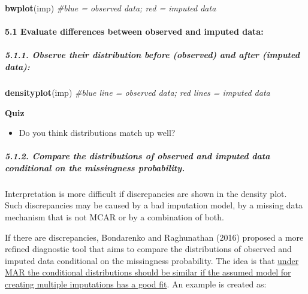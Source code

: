 \documentclass[
]{article}
\newenvironment{Shaded}{\begin{snugshade}}{\end{snugshade}}
\newcommand{\CommentTok}[1]{\textcolor[rgb]{0.56,0.35,0.01}{\textit{#1}}}
\newcommand{\FunctionTok}[1]{\textcolor[rgb]{0.13,0.29,0.53}{\textbf{#1}}}
\newcommand{\NormalTok}[1]{#1}
\providecommand{\tightlist}{%
  \setlength{\itemsep}{0pt}\setlength{\parskip}{0pt}}
\begin{document}
\begin{Shaded}
\begin{Highlighting}[]
\FunctionTok{bwplot}\NormalTok{(imp)    }\CommentTok{\#blue = observed data; red = imputed data}
\end{Highlighting}
\end{Shaded}

\hypertarget{evaluate-differences-between-observed-and-imputed-data}{%
\paragraph{5.1 Evaluate differences between observed and imputed
data:}\label{evaluate-differences-between-observed-and-imputed-data}}

\hypertarget{observe-their-distribution-before-observed-and-after-imputed-data}{%
\subparagraph{5.1.1. Observe their distribution before (observed) and
after (imputed
data):}\label{observe-their-distribution-before-observed-and-after-imputed-data}}

\begin{Shaded}
\begin{Highlighting}[]
\FunctionTok{densityplot}\NormalTok{(imp) }\CommentTok{\#blue line = observed data; red lines = imputed data }
\end{Highlighting}
\end{Shaded}

\textbf{Quiz}

\begin{itemize}
\tightlist
\item
  Do you think distributions match up well?
\end{itemize}

\hypertarget{compare-the-distributions-of-observed-and-imputed-data-conditional-on-the-missingness-probability.}{%
\subparagraph{5.1.2. Compare the distributions of observed and imputed
data conditional on the missingness
probability.}\label{compare-the-distributions-of-observed-and-imputed-data-conditional-on-the-missingness-probability.}}

Interpretation is more difficult if discrepancies are shown in the
density plot. Such discrepancies may be caused by a bad imputation
model, by a missing data mechanism that is not MCAR or by a combination
of both.

If there are discrepancies, Bondarenko and Raghunathan (2016) proposed a
more refined diagnostic tool that aims to compare the distributions of
observed and imputed data conditional on the missingness probability.
The idea is that \ul{under MAR the conditional distributions should be
similar if the assumed model for creating multiple imputations has a
good fit}. An example is created as:
\end{document}
